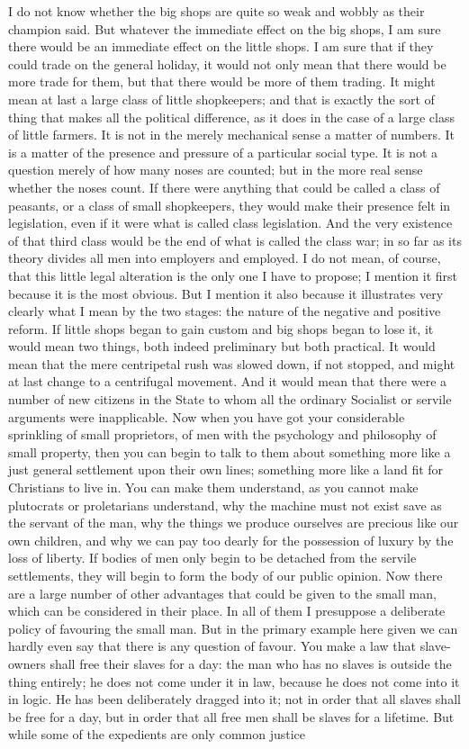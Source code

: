 \documentclass{book}
\begin{document}
I do not know whether the big shops are quite so weak and wobbly as their champion said. But whatever the immediate effect on the big shops, I am sure there would be an immediate effect on the little shops. I am sure that if they could trade on the general holiday, it would not only mean that there would be more trade for them, but that there would be more of them trading. It might mean at last a large class of little shopkeepers; and that is exactly the sort of thing that makes all the political difference, as it does in the case of a large class of little farmers. It is not in the merely mechanical sense a matter of numbers. It is a matter of the presence and pressure of a particular social type. It is not a question merely of how many noses are counted; but in the more real sense whether the noses count. If there were anything that could be called a class of peasants, or a class of small shopkeepers, they would make their presence felt in legislation, even if it were what is called class legislation. And the very existence of that third class would be the end of what is called the class war; in so far as its theory divides all men into employers and employed. I do not mean, of course, that this little legal alteration is the only one I have to propose; I mention it first because it is the most obvious. But I mention it also because it illustrates very clearly what I mean by the two stages: the nature of the negative and positive reform. If little shops began to gain custom and big shops began to lose it, it would mean two things, both indeed preliminary but both practical. It would mean that the mere centripetal rush was slowed down, if not stopped, and might at last change to a centrifugal movement. And it would mean that there were a number of new citizens in the State to whom all the ordinary Socialist or servile arguments were inapplicable. Now when you have got your considerable sprinkling of small proprietors, of men with the psychology and philosophy of small property, then you can begin to talk to them about something more like a just general settlement upon their own lines; something more like a land fit for Christians to live in. You can make them understand, as you cannot make plutocrats or proletarians understand, why the machine must not exist save as the servant of the man, why the things we produce ourselves are precious like our own children, and why we can pay too dearly for the possession of luxury by the loss of liberty. If bodies of men only begin to be detached from the servile settlements, they will begin to form the body of our public opinion. Now there are a large number of other advantages that could be given to the small man, which can be considered in their place. In all of them I presuppose a deliberate policy of favouring the small man. But in the primary example here given we can hardly even say that there is any question of favour. You make a law that slave-owners shall free their slaves for a day: the man who has no slaves is outside the thing entirely; he does not come under it in law, because he does not come into it in logic. He has been deliberately dragged into it; not in order that all slaves shall be free for a day, but in order that all free men shall be slaves for a lifetime. But while some of the expedients are only common justice 
\end{document}
